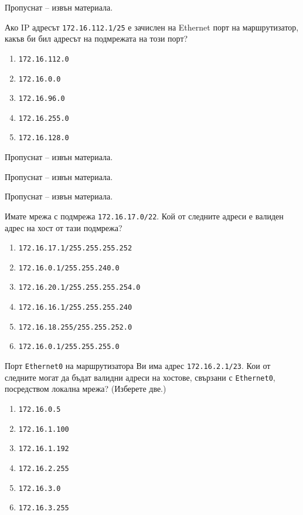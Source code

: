 \begin{q}
  Пропуснат – извън материала.
\end{q}

\begin{q}
  Ако IP адресът \texttt{172.16.112.1/25} е зачислен на Ethernet порт на
  маршрутизатор, какъв би бил адресът на подмрежата на този порт?
  \begin{enumerate}
  \item \texttt{172.16.112.0}
  \item \texttt{172.16.0.0}
  \item \texttt{172.16.96.0}
  \item \texttt{172.16.255.0}
  \item \texttt{172.16.128.0}
  \end{enumerate}
\end{q}

\begin{q}
  Пропуснат – извън материала.
\end{q}

\begin{q}
  Пропуснат – извън материала.
\end{q}

\begin{q}
  Пропуснат – извън материала.
\end{q}

\begin{q}
  Имате мрежа с подмрежа \texttt{172.16.17.0/22}. Кой от следните адреси е
  валиден адрес на хост от тази подмрежа?
  \begin{enumerate}
  \item \texttt{172.16.17.1/255.255.255.252}
  \item \texttt{172.16.0.1/255.255.240.0}
  \item \texttt{172.16.20.1/255.255.255.254.0}
  \item \texttt{172.16.16.1/255.255.255.240}
  \item \texttt{172.16.18.255/255.255.252.0}
  \item \texttt{172.16.0.1/255.255.255.0}
  \end{enumerate}
\end{q}

\begin{q}
  Порт \texttt{Ethernet0} на маршрутизатора Ви има адрес
  \texttt{172.16.2.1/23}. Кои от следните могат да бъдат валидни адреси на
  хостове, свързани с \texttt{Ethernet0}, посредством локална мрежа? (Изберете
  две.)
  \begin{enumerate}
  \item \texttt{172.16.0.5}
  \item \texttt{172.16.1.100}
  \item \texttt{172.16.1.192}
  \item \texttt{172.16.2.255}
  \item \texttt{172.16.3.0}
  \item \texttt{172.16.3.255}
  \end{enumerate}
\end{q}

